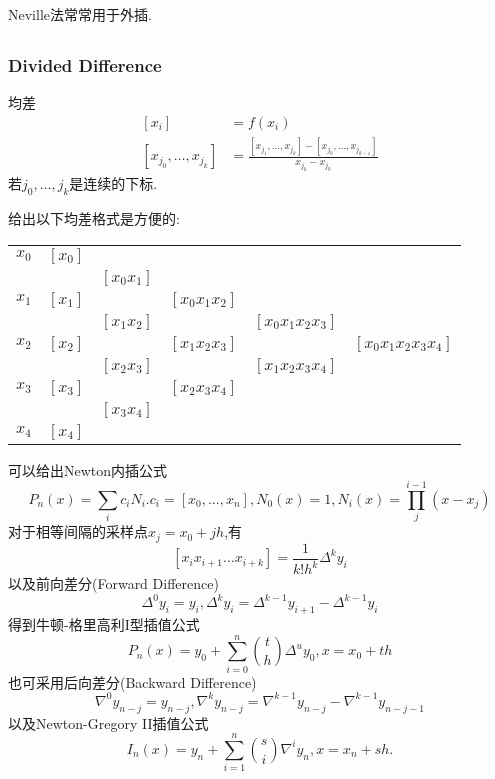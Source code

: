 \documentclass{article}
\begin{document}
Neville法常常用于外插.

\subsection{\np}

\subsubsection{Divided Difference}

 均差
$$\begin{aligned}
        [x_i]                   & =f(x_i)                                                                      \\
        [x_{j_0},\dots,x_{j_k}] & =\frac{[x_{j_1},\dots,x_{j_k}]-[x_{j_0},\dots,x_{j_{k-1}}]}{x_{j_k}-x_{j_0}}
    \end{aligned}$$
若$j_0,\dots,j_k$是连续的下标.

给出以下均差格式是方便的:\\
\begin{tabular}{c|ccccc}
    \hline
    $x_0$ & $[x_0]$                                                                       \\
          &         & $[x_0x_1]$                                                          \\
    $x_1$ & $[x_1]$ &            & $[x_0x_1x_2]$                                          \\
          &         & $[x_1x_2]$ &               & $[x_0x_1x_2x_3]$                       \\
    $x_2$ & $[x_2]$ &            & $[x_1x_2x_3]$ &                  & $[x_0x_1x_2x_3x_4]$ \\
          &         & $[x_2x_3]$ &               & $[x_1x_2x_3x_4]$                       \\
    $x_3$ & $[x_3]$ &            & $[x_2x_3x_4]$                                          \\
          &         & $[x_3x_4]$                                                          \\
    $x_4$ & $[x_4]$                                                                       \\
    \hline
\end{tabular}

可以给出Newton内插公式
$$P_n(x)=\sum_i c_i N_i. c_i=[x_0,...,x_n], N_0(x)=1,N_i(x)=\prod_j^{i-1}(x-x_j)$$
对于相等间隔的采样点$x_j=x_0+jh$,有
$$
    [x_ix_{i+1}\dots x_{i+k}]=\frac{1}{k!h^k}\Delta^k y_i
$$
以及前向差分(Forward Difference)
$$
    \Delta^0 y_i=y_i,\Delta^k y_i=\Delta^{k-1} y_{i+1}-\Delta^{k-1} y_{i}
$$
得到牛顿-格里高利I型插值公式
$$
    P_n(x)=y_0+\sum_{i=0}^n \binom{t}{h} \Delta^u y_0,x=x_0+th
$$
也可采用后向差分(Backward Difference)
$$
    \nabla^0 y_{n-j}=y_{n-j},\nabla^k y_{n-j}=\nabla^{k-1} y_{n-j}-\nabla^{k-1} y_{n-j-1}
$$
以及Newton-Gregory II插值公式
$$
    I_n(x)=y_n+\sum_{i=1}^n \binom{s}{i} \nabla^i y_n, x=x_n+sh.
$$
\end{document}

